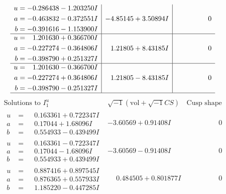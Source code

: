 \documentclass[1p]{elsarticle_modified}
\theoremstyle{definition}
\newcommand{\I}{\sqrt{-1}}
\begin{document}
$$\begin{array}{c|c|c}
\begin{aligned}
u &= -0.286438 - 1.203250 I \\
a &= -0.463832 - 0.372551 I \\
b &= -0.391616 - 1.153900 I\end{aligned}
 & -4.85145 + 3.50894 I & \phantom{-0.000000 } 0 \\ \hline\begin{aligned}
u &= \phantom{-}1.201630 + 0.366700 I \\
a &= -0.227274 - 0.364806 I \\
b &= -0.398790 + 0.251327 I\end{aligned}
 & \phantom{-}1.21805 + 8.43185 I & \phantom{-0.000000 } 0 \\ \hline\begin{aligned}
u &= \phantom{-}1.201630 - 0.366700 I \\
a &= -0.227274 + 0.364806 I \\
b &= -0.398790 - 0.251327 I\end{aligned}
 & \phantom{-}1.21805 - 8.43185 I & \phantom{-0.000000 } 0\\
 \hline 
 \end{array}$$\newpage$$\begin{array}{c|c|c}  
\text{Solutions to }I^u_{1}& \I (\text{vol} + \sqrt{-1}CS) & \text{Cusp shape}\\
 \hline 
\begin{aligned}
u &= \phantom{-}0.163361 + 0.722347 I \\
a &= \phantom{-}0.17044 + 1.68096 I \\
b &= \phantom{-}0.554933 - 0.439499 I\end{aligned}
 & -3.60569 + 0.91408 I & \phantom{-0.000000 } 0 \\ \hline\begin{aligned}
u &= \phantom{-}0.163361 - 0.722347 I \\
a &= \phantom{-}0.17044 - 1.68096 I \\
b &= \phantom{-}0.554933 + 0.439499 I\end{aligned}
 & -3.60569 - 0.91408 I & \phantom{-0.000000 } 0 \\ \hline\begin{aligned}
u &= \phantom{-}0.887416 + 0.897545 I \\
a &= \phantom{-}0.876365 + 0.557933 I \\
b &= \phantom{-}1.185220 - 0.447285 I\end{aligned}
 & \phantom{-}0.484505 + 0.801877 I & \phantom{-0.000000 } 0 \\ \hline\begin{aligned}

\end{aligned}
\end{array}$$
\end{document}
